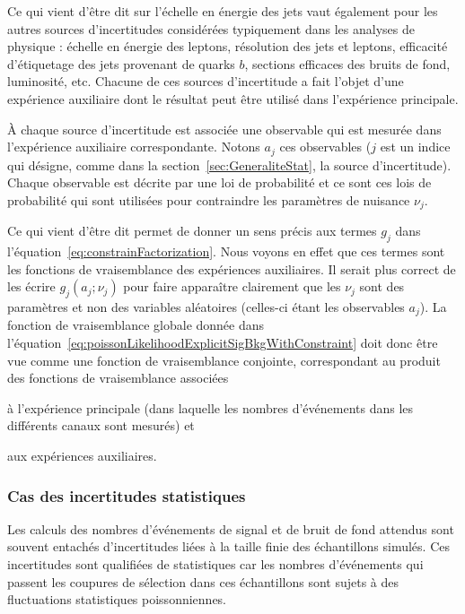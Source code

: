 Ce qui vient d'\^etre dit sur l'\'echelle en \'energie des jets vaut \'egalement pour les autres sources d'incertitudes consid\'er\'ees typiquement dans les analyses de physique : \'echelle en \'energie des leptons, r\'esolution des jets et leptons, efficacit\'e d'\'etiquetage des jets provenant de quarks $b$, sections efficaces des bruits de fond, luminosit\'e, etc. Chacune de ces sources d'incertitude a fait l'objet d'une exp\'erience auxiliaire dont le r\'esultat peut \^etre utilis\'e dans l'expérience principale.

\`A chaque source d'incertitude est associ\'ee une observable qui est mesur\'ee dans l'exp\'erience auxiliaire correspondante. Notons $a_j$ ces observables ($j$ est un indice qui d\'esigne, comme dans la section~\ref{sec:GeneraliteStat}, la source d'incertitude). Chaque observable est d\'ecrite par une loi de probabilit\'e et ce sont ces lois de probabilit\'e qui sont utilis\'ees pour contraindre les param\`etres de nuisance $\nu_j$. 

Ce qui vient d'\^etre dit permet de donner un sens pr\'ecis aux termes $g_j$ dans l'\'equation~\ref{eq:constrainFactorization}. Nous voyons en effet que ces termes sont les fonctions de vraisemblance des exp\'eriences auxiliaires. Il serait plus correct de les \'ecrire $g_j\left(a_j;\nu_j\right)$ pour faire appara\^itre clairement que les $\nu_j$ sont des param\`etres et non des variables al\'eatoires (celles-ci \'etant les observables $a_j$). La fonction de vraisemblance globale donn\'ee dans l'\'equation~\ref{eq:poissonLikelihoodExplicitSigBkgWithConstraint} doit donc \^etre vue comme une fonction de vraisemblance conjointe, correspondant au produit des fonctions de vraisemblance associ\'ees 
\begin{maliste}
\item \`a l'exp\'erience principale (dans laquelle les nombres d'\'ev\'enements dans les diff\'erents canaux sont mesur\'es) et
\item aux exp\'eriences auxiliaires.
\end{maliste}

\subsubsection{Cas des incertitudes statistiques}
\label{sec:frequentistTreatmentOfStatUncert}

Les calculs des nombres d'\'ev\'enements de signal et de bruit de fond attendus sont souvent entach\'es d'incertitudes li\'ees \`a la taille finie des \'echantillons simul\'es. Ces incertitudes sont qualifi\'ees de statistiques car les nombres d'\'ev\'enements qui passent les coupures de s\'election dans ces \'echantillons sont sujets \`a des fluctuations statistiques poissonniennes. 

